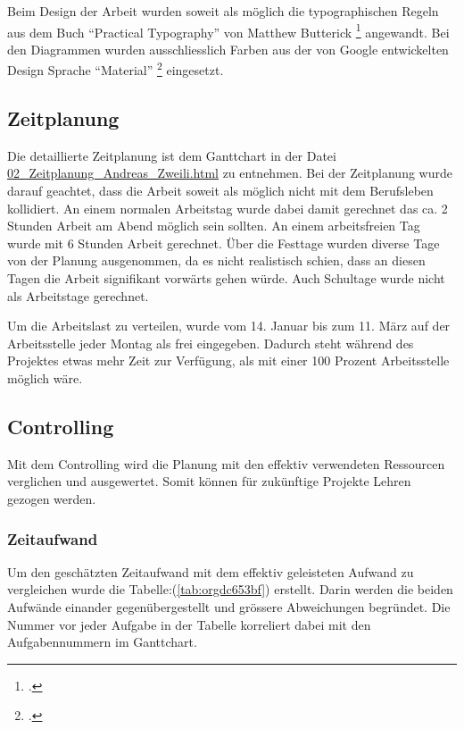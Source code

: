 Beim Design der Arbeit wurden soweit als möglich die typographischen Regeln aus
dem Buch "`Practical Typography"' von Matthew Butterick \footcite{typo} angewandt.
Bei den Diagrammen wurden ausschliesslich Farben aus der von Google
entwickelten Design Sprache "`Material"' \footcite{material} eingesetzt.

\subsection{Zeitplanung}
\label{sec:org3e1f3c8}

Die detaillierte Zeitplanung ist dem Ganttchart in der Datei
\href{02\_Zeitplanung\_Andreas\_Zweili.html}{02\_Zeitplanung\_Andreas\_Zweili.html} zu entnehmen. Bei der Zeitplanung wurde
darauf geachtet, dass die Arbeit soweit als möglich nicht mit dem Berufsleben
kollidiert. An einem normalen Arbeitstag wurde dabei damit gerechnet das ca. 2
Stunden Arbeit am Abend möglich sein sollten. An einem arbeitsfreien Tag wurde
mit 6 Stunden Arbeit gerechnet. Über die Festtage wurden diverse Tage von der
Planung ausgenommen, da es nicht realistisch schien, dass an diesen Tagen die
Arbeit signifikant vorwärts gehen würde. Auch Schultage wurde nicht als
Arbeitstage gerechnet.

Um die Arbeitslast zu verteilen, wurde vom 14. Januar bis zum 11. März auf der
Arbeitsstelle jeder Montag als frei eingegeben. Dadurch steht während des
Projektes etwas mehr Zeit zur Verfügung, als mit einer 100 Prozent
Arbeitsstelle möglich wäre.

\subsection{Controlling}
\label{sec:org208d93d}

Mit dem Controlling wird die Planung mit den effektiv verwendeten Ressourcen
verglichen und ausgewertet. Somit können für zukünftige Projekte Lehren gezogen
werden.

\subsubsection{Zeitaufwand}
\label{sec:org48b7af7}

Um den geschätzten Zeitaufwand mit dem effektiv geleisteten Aufwand zu
vergleichen wurde die Tabelle:(\ref{tab:orgdc653bf}) erstellt. Darin werden die beiden
Aufwände einander gegenübergestellt und grössere Abweichungen begründet.
Die Nummer vor jeder Aufgabe in der Tabelle korreliert dabei mit den
Aufgabennummern im Ganttchart.

